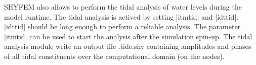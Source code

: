  SHYFEM also allows to perform the tidal analysis of water levels
 during the model runtime. The tidal analysis is actived by setting
 |itmtid| and |idttid|. |idttid| should be long enough to perform 
 a reliable analysis. The parameter |itmtid| can be used to start 
 the analysis after the simulation spin-up. The tidal analysis module
 write an output file .tide.shy containing amplitudes and phases
 of all tidal constituents over the computational domain (on the 
 nodes).
